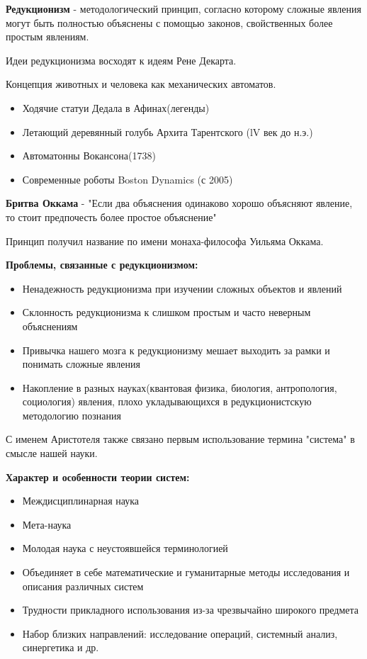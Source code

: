 \documentclass[a4paper]{article}
\begin{document}
	\textbf{Редукционизм} - методологический принцип, согласно которому сложные явления могут быть полностью объяснены с помощью законов, свойственных более простым явлениям.
	
	Идеи редукционизма восходят к идеям Рене Декарта. 
	
	Концепция животных и человека как механических автоматов.
	\begin{itemize}
		\item Ходячие статуи Дедала в Афинах(легенды)
		\item Летающий деревянный голубь Архита Тарентского (lV век до н.э.)
		\item Автоматонны Вокансона(1738)
		\item Современные роботы Boston Dynamics (с 2005)
	\end{itemize}
	
	\textbf{Бритва Оккама} - "Если два объяснения одинаково хорошо объясняют явление, то стоит предпочесть более простое объяснение"
	
	Принцип получил название по имени монаха-философа Уильяма Оккама.
	
\textbf{	Проблемы, связанные с редукционизмом:}
		\begin{itemize}
		\item Ненадежность редукционизма при изучении сложных объектов и явлений
		\item Склонность редукционизма к слишком простым и часто неверным объяснениям
		\item Привычка нашего мозга к редукционизму мешает выходить за рамки и понимать сложные явления
		\item Накопление в разных науках(квантовая физика, биология, антропология, социология) явления, плохо укладывающихся в редукционистскую методологию познания
	\end{itemize}
	
	С именем Аристотеля также связано первым использование термина "система" в смысле нашей науки.
	
	\textbf{Характер и особенности теории систем:}
		\begin{itemize}
		\item Междисциплинарная наука
		\item Мета-наука
		\item Молодая наука с неустоявшейся терминологией
		\item Объединяет в  себе математические и гуманитарные методы исследования и описания различных систем
		\item Трудности прикладного использования из-за чрезвычайно широкого предмета
		\item Набор близких направлений: исследование операций, системный анализ, синергетика и др.
	\end{itemize}
\end{document}
